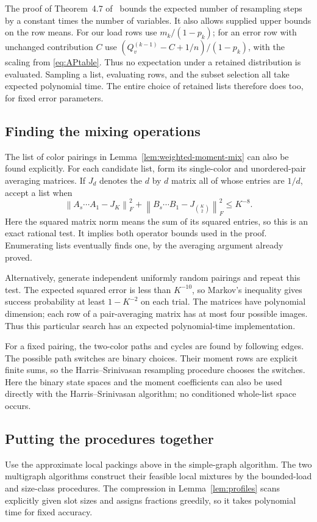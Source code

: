 \documentclass[11pt]{article}
\theoremstyle{definition}\newtheorem{algorithm}{Algorithm}[section]
\numberwithin{equation}{section}
\theoremstyle{remark}\newtheorem*{remark}{Remark}
\begin{document}
The proof of Theorem~4.7 of~\cite{HS} bounds the expected number of
resampling steps by a constant times the number of variables. It also
allows supplied upper bounds on the row means. For our load rows use
$m_k/(1-p_k)$; for an error row with unchanged contribution $C$ use
$(Q_v^{(k-1)}-C+1/n)/(1-p_k)$, with the scaling from
\eqref{eq:APtable}. Thus no expectation under a retained distribution is
evaluated. Sampling a list, evaluating rows, and the subset selection
all take expected polynomial time. The entire choice of retained lists
therefore does too, for fixed error parameters.
\subsection*{Finding the mixing operations}
The list of color pairings in Lemma~\ref{lem:weighted-moment-mix}
can also be found explicitly. For each candidate list, form its
single-color and unordered-pair averaging matrices. If $J_d$ denotes
the $d$ by $d$ matrix all of whose entries are $1/d$, accept a list
when
\[
 \left\|A_s\cdots A_1-J_K\right\|_F^2
 +\left\|B_s\cdots B_1-J_{\binom K2}\right\|_F^2
 \le K^{-8}.
\]
Here the squared matrix norm means the sum of its squared entries,
so this is an exact rational test. It implies both operator bounds
used in the proof. Enumerating lists eventually finds one, by the
averaging argument already proved.

Alternatively, generate independent uniformly random pairings and
repeat this test. The expected squared error is less than $K^{-10}$,
so Markov's inequality gives success probability at least $1-K^{-2}$
on each trial. The matrices have polynomial dimension; each row of a
pair-averaging matrix has at most four possible images. Thus this
particular search has an expected polynomial-time implementation.

For a fixed pairing, the two-color paths and cycles are found by
following edges. The possible path switches are binary choices. Their
moment rows are explicit finite sums, so the Harris--Srinivasan resampling procedure chooses the switches. Here the binary state spaces and
the moment coefficients can also be used directly with the
Harris--Srinivasan algorithm; no conditioned whole-list space occurs.


\subsection{Putting the procedures together}
Use the approximate local packings above in the simple-graph algorithm.
The two multigraph algorithms construct their feasible local mixtures
by the bounded-load and size-class procedures. The compression in
Lemma~\ref{lem:profiles} scans explicitly given slot sizes and assigns
fractions greedily, so it takes polynomial time for fixed accuracy.
\end{document}
